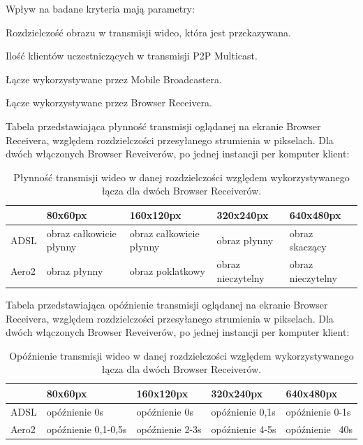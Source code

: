 Wpływ na badane kryteria mają parametry:
\begin{packed_item}
    \item{Rozdzielczość obrazu w transmisji wideo, która jest przekazywana.}
    \item{Ilość klientów uczestniczących w transmisji P2P Multicast.}
    \item{Łącze wykorzystywane przez Mobile Broadcastera.}
    \item{Łącze wykorzystywane przez Browser Receivera.}
\end{packed_item}

Tabela przedstawiająca płynność transmisji oglądanej na ekranie Browser Receivera, względem rozdzielczości przesyłanego strumienia w pikselach. Dla dwóch włączonych Browser Reveiverów, po jednej instancji per komputer klient:
\begin{table}[h]
    \centering
    \begin{tabular}{|l|l|l|l|l|}
        \hline
        & 80x60px & 160x120px & 320x240px & 640x480px \\
        \hline
        ADSL
        &
        obraz całkowicie płynny 
        &
        obraz całkowicie płynny
        &
        obraz płynny
        &
        obraz skaczący
        \\
        \hline
        Aero2
        &
        obraz płynny
        &
        obraz poklatkowy
        &
        obraz nieczytelny
        &
        obraz nieczytelny
        \\
        \hline
    \end{tabular}
    \caption{Płynność transmisji wideo w danej rozdzielczości względem wykorzystywanego łącza dla dwóch Browser Receiverów.}
\end{table}

Tabela przedstawiająca opóźnienie transmisji oglądanej na ekranie Browser Receivera, względem rozdzielczości przesyłanego strumienia w pikselach. Dla dwóch włączonych Browser Reveiverów, po jednej instancji per komputer klient:
\begin{table}[h]
    \centering
    \begin{tabular}{|l|l|l|l|l|}
        \hline
        & 80x60px & 160x120px & 320x240px & 640x480px \\
        \hline
        ADSL
        &
        opóźnienie 0s
        &
        opóźnienie 0s
        &
        opóźnienie 0,1s
        &
        opóźnienie 0-1s \\
        \hline
        Aero2
        &
        opóźnienie 0,1-0,5s
        &
        opóźnienie 2-3s
        &
        opóźnienie 4-5s
        &
        opóźnienie ~40s \\
        \hline
    \end{tabular}
    \caption{Opóźnienie transmisji wideo w danej rozdzielczości względem wykorzystywanego łącza dla dwóch Browser Receiverów.}
\end{table}

